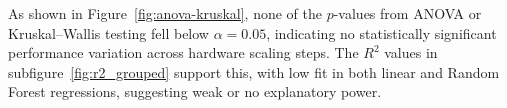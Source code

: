 As shown in Figure~\ref{fig:anova-kruskal}, none of the $p$-values from ANOVA or Kruskal--Wallis testing fell below $\alpha = 0.05$, indicating no statistically significant performance variation across hardware scaling steps. The $R^2$ values in subfigure~\ref{fig:r2_grouped} support this, with low fit in both linear and Random Forest regressions, suggesting weak or no explanatory power.

